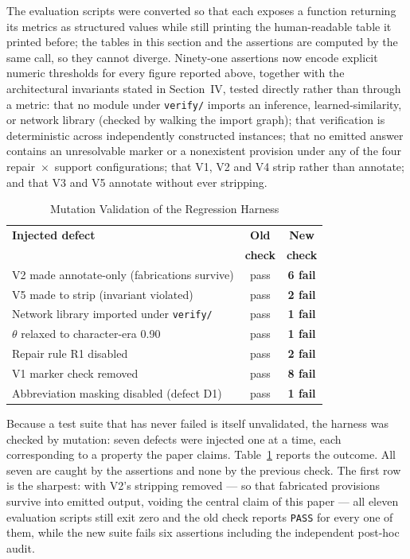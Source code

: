 \documentclass[conference]{IEEEtran}
\begin{document}
The evaluation scripts were converted so that each exposes a function
returning its metrics as structured values while still printing the
human-readable table it printed before; the tables in this section and the
assertions are computed by the same call, so they cannot diverge. Ninety-one
assertions now encode explicit numeric thresholds for every figure reported
above, together with the architectural invariants stated in Section~IV, tested
directly rather than through a metric: that no module under \texttt{verify/}
imports an inference, learned-similarity, or network library (checked by
walking the import graph); that verification is deterministic across
independently constructed instances; that no emitted answer contains an
unresolvable marker or a nonexistent provision under any of the four
repair~$\times$~support configurations; that V1, V2 and V4 strip rather than
annotate; and that V3 and V5 annotate without ever stripping.

\begin{table}[t]
\caption{Mutation Validation of the Regression Harness}
\label{tab:mutation}
\centering
\footnotesize
\begin{tabular}{@{}lcc@{}}
\toprule
\textbf{Injected defect} & \textbf{Old} & \textbf{New} \\
                         & \textbf{check} & \textbf{check} \\
\midrule
V2 made annotate-only (fabrications survive) & pass & \textbf{6 fail} \\
V5 made to strip (invariant violated)        & pass & \textbf{2 fail} \\
Network library imported under \texttt{verify/} & pass & \textbf{1 fail} \\
$\theta$ relaxed to character-era 0.90       & pass & \textbf{1 fail} \\
Repair rule R1 disabled                      & pass & \textbf{2 fail} \\
V1 marker check removed                      & pass & \textbf{8 fail} \\
Abbreviation masking disabled (defect D1)    & pass & \textbf{1 fail} \\
\bottomrule
\end{tabular}
\end{table}

Because a test suite that has never failed is itself unvalidated, the harness
was checked by mutation: seven defects were injected one at a time, each
corresponding to a property the paper claims. Table~\ref{tab:mutation} reports
the outcome. All seven are caught by the assertions and none by the previous
check. The first row is the sharpest: with V2's stripping removed --- so that
fabricated provisions survive into emitted output, voiding the central claim of
this paper --- all eleven evaluation scripts still exit zero and the old check
reports \texttt{PASS} for every one of them, while the new suite fails six
assertions including the independent post-hoc audit.
\end{document}
